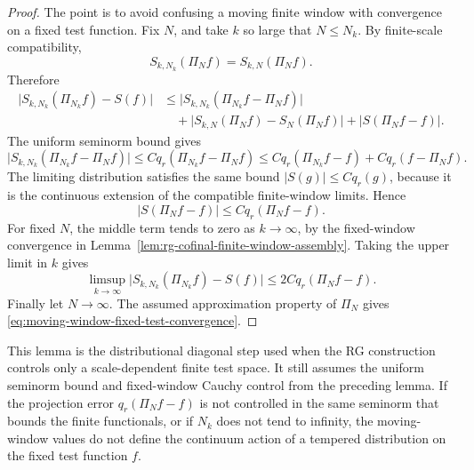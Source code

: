 \begin{proof}
The point is to avoid confusing a moving finite window with convergence on a
fixed test function.  Fix \(N\), and take \(k\) so large that \(N\le N_k\).
By finite-scale compatibility,
\[
  S_{k,N_k}(\Pi_Nf)=S_{k,N}(\Pi_Nf).
\]
Therefore
\[
\begin{aligned}
  \bigl|S_{k,N_k}(\Pi_{N_k}f)-S(f)\bigr|
  &\le
  \bigl|S_{k,N_k}(\Pi_{N_k}f-\Pi_Nf)\bigr|        \\
  &\quad+
  \bigl|S_{k,N}(\Pi_Nf)-S_N(\Pi_Nf)\bigr|
  +
  \bigl|S(\Pi_Nf-f)\bigr| .
\end{aligned}
\]
The uniform seminorm bound gives
\[
  \bigl|S_{k,N_k}(\Pi_{N_k}f-\Pi_Nf)\bigr|
  \le
  C q_r(\Pi_{N_k}f-\Pi_Nf)
  \le
  Cq_r(\Pi_{N_k}f-f)+Cq_r(f-\Pi_Nf).
\]
The limiting distribution satisfies the same bound
\(|S(g)|\le Cq_r(g)\), because it is the continuous extension of the
compatible finite-window limits.  Hence
\[
  |S(\Pi_Nf-f)|\le Cq_r(\Pi_Nf-f).
\]
For fixed \(N\), the middle term tends to zero as \(k\to\infty\), by the
fixed-window convergence in
Lemma~\ref{lem:rg-cofinal-finite-window-assembly}.  Taking the upper limit
in \(k\) gives
\[
  \limsup_{k\to\infty}
  \bigl|S_{k,N_k}(\Pi_{N_k}f)-S(f)\bigr|
  \le
  2C q_r(\Pi_Nf-f).
\]
Finally let \(N\to\infty\).  The assumed approximation property of
\(\Pi_N\) gives \eqref{eq:moving-window-fixed-test-convergence}.
\end{proof}

This lemma is the distributional diagonal step used when the RG construction
controls only a scale-dependent finite test space.  It still assumes the
uniform seminorm bound and fixed-window Cauchy control from the preceding
lemma.  If the projection error \(q_r(\Pi_Nf-f)\) is not controlled in the
same seminorm that bounds the finite functionals, or if \(N_k\) does not tend
to infinity, the moving-window values do not define the continuum action of a
tempered distribution on the fixed test function \(f\).

